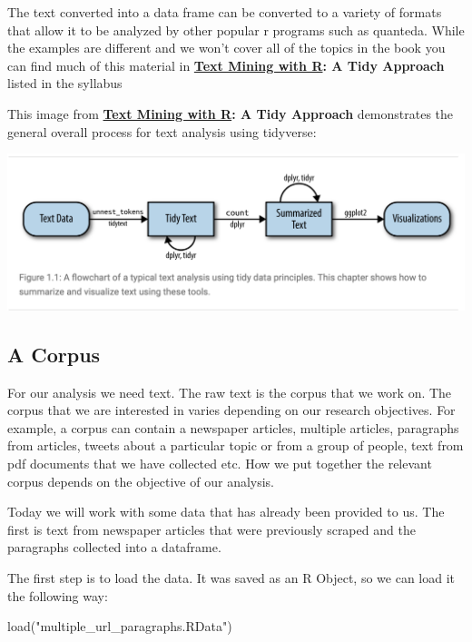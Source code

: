 \documentclass[
  letterpaper,
  DIV=11,
  numbers=noendperiod]{scrartcl}
\newenvironment{Shaded}{\begin{snugshade}}{\end{snugshade}}
\newcommand{\FunctionTok}[1]{\textcolor[rgb]{0.28,0.35,0.67}{#1}}
\newcommand{\NormalTok}[1]{\textcolor[rgb]{0.00,0.23,0.31}{#1}}
\newcommand{\StringTok}[1]{\textcolor[rgb]{0.13,0.47,0.30}{#1}}
\begin{document}
The text converted into a data frame can be converted to a variety of
formats that allow it to be analyzed by other popular r programs such as
quanteda. While the examples are different and we won't cover all of the
topics in the book you can find much of this material in
\href{https://www.tidytextmining.com/index.html}{\textbf{Text Mining
with R}}\textbf{: A Tidy Approach} listed in the syllabus

This image from
\href{https://www.tidytextmining.com/index.html}{\textbf{Text Mining
with R}}\textbf{: A Tidy Approach} demonstrates the general overall
process for text analysis using tidyverse:

\includegraphics{Images/2.png}

\hypertarget{a-corpus}{%
\subsection{A Corpus}\label{a-corpus}}

For our analysis we need text. The raw text is the corpus that we work
on. The corpus that we are interested in varies depending on our
research objectives. For example, a corpus can contain a newspaper
articles, multiple articles, paragraphs from articles, tweets about a
particular topic or from a group of people, text from pdf documents that
we have collected etc. How we put together the relevant corpus depends
on the objective of our analysis.

Today we will work with some data that has already been provided to us.
The first is text from newspaper articles that were previously scraped
and the paragraphs collected into a dataframe.

The first step is to load the data. It was saved as an R Object, so we
can load it the following way:

\begin{Shaded}
\begin{Highlighting}[]
\FunctionTok{load}\NormalTok{(}\StringTok{"multiple\_url\_paragraphs.RData"}\NormalTok{)}
\end{Highlighting}
\end{Shaded}
\end{document}
